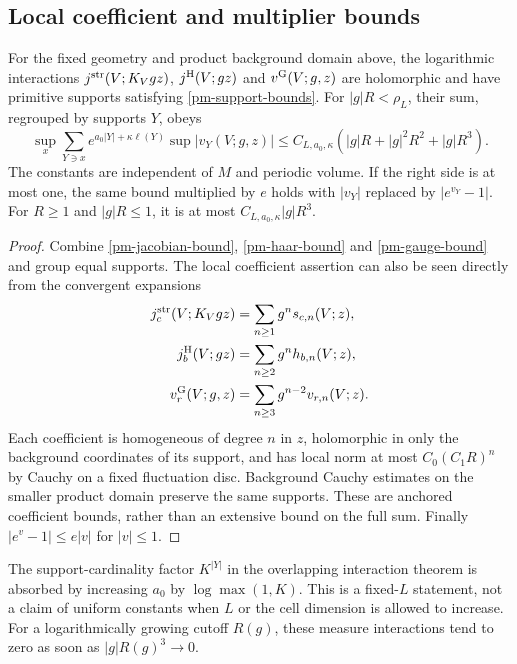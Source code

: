 \subsection{Local coefficient and multiplier bounds}
\label{pm-coefficients-section}

\begin{theorem}\label{pm-measure-theorem}
For the fixed geometry and product background domain above,
the logarithmic interactions
$j^{\rm str}(V;K_Vgz)$, $j^{\rm H}(V;gz)$ and
$v^{\rm G}(V;g,z)$ are holomorphic and have primitive
supports satisfying \eqref{pm-support-bounds}. For
$|g|R<\rho_L$, their sum, regrouped by supports $Y$, obeys
\begin{equation}\label{pm-combined-bound}
 \sup_x\sum_{Y\ni x}e^{a_0|Y|+\kappa\ell(Y)}
 \sup|v_Y(V;g,z)|
 \le C_{L,a_0,\kappa}
   (|g|R+|g|^2R^2+|g|R^3).
\end{equation}
The constants are independent of $M$ and periodic volume.
If the right side is at most one, the same bound multiplied
by $e$ holds with $|v_Y|$ replaced by $|e^{v_Y}-1|$.
For $R\ge1$ and $|g|R\le1$, it is at most
$C_{L,a_0,\kappa}|g|R^3$.
\end{theorem}
\begin{proof}
Combine \eqref{pm-jacobian-bound},
\eqref{pm-haar-bound} and \eqref{pm-gauge-bound} and group
equal supports. The local coefficient assertion can also
be seen directly from the convergent expansions
\[
 \begin{split}
 j_c^{\rm str}(V;K_Vgz)&=\sum_{n\ge1}g^n s_{c,n}(V;z),\\
 j_b^{\rm H}(V;gz)&=\sum_{n\ge2}g^n h_{b,n}(V;z),\\
 v_r^{\rm G}(V;g,z)&=\sum_{n\ge3}g^{n-2}v_{r,n}(V;z).
 \end{split}
\]
Each coefficient is homogeneous of degree $n$ in $z$,
holomorphic in only the background coordinates of its support,
and has local norm at most $C_0(C_1R)^n$ by Cauchy on a
fixed fluctuation disc. Background Cauchy estimates on the
smaller product domain preserve the same supports. These are
anchored coefficient bounds, rather than an extensive bound
on the full sum. Finally $|e^v-1|\le e|v|$ for $|v|\le1$.
\end{proof}

The support-cardinality factor $K^{|Y|}$ in the overlapping
interaction theorem is absorbed by increasing $a_0$ by
$\log\max(1,K)$. This is a fixed-$L$ statement, not a
claim of uniform constants when $L$ or the cell dimension is
allowed to increase. For a logarithmically growing cutoff
$R(g)$, these measure interactions tend to zero as soon as
$|g|R(g)^3\to0$.

